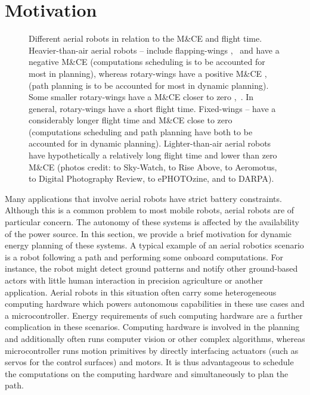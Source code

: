 \section{Motivation}
\label{sec:motivation}

\begin{figure}[t]
  \centering
  \footnotesize{}\selectfont
  
  \caption[Different aerial robots in relation to the M\&CE and flight time]{Different aerial robots in relation to the M\&CE and flight time. Heavier-than-air aerial robots -- include flapping-wings ,~ and have a negative M\&CE (computations scheduling is to be accounted for most in planning), whereas rotary-wings have a positive M\&CE ,~ (path planning is to be accounted for most in dynamic planning). Some smaller rotary-wings have a M\&CE closer to zero ,~. In general, rotary-wings have a short flight time. Fixed-wings -- have a considerably longer flight time and M\&CE close to zero (computations scheduling and path planning have both to be accounted for in dynamic planning). Lighter-than-air aerial robots  have hypothetically a relatively long flight time and lower than zero M\&CE {\scriptsize(photos credit:  to Sky-Watch,  to Rise Above,  to Aeromotus,  to Digital Photography Review,  to ePHOTOzine, and  to DARPA)}.}
  \label{fig:plot10}
\end{figure}

Many applications that involve aerial robots have strict battery constraints. Although this is a common problem to most mobile robots, aerial robots are of particular concern. The autonomy of these systems is affected by the availability of the power source. In this section, we provide a brief motivation for dynamic energy planning of these systems. A typical example of an aerial robotics scenario is a robot following a path and performing some onboard computations. For instance, the robot might detect ground patterns and notify other ground-based actors with little human interaction in precision agriculture or another application. Aerial robots in this situation often carry some heterogeneous computing hardware which powers autonomous capabilities in these use cases and a microcontroller. Energy requirements of such computing hardware are a further complication in these scenarios. Computing hardware is involved in the planning and additionally often runs computer vision or other complex algorithms, whereas microcontroller runs motion primitives by directly interfacing actuators (such as servos for the control surfaces) and motors. It is thus advantageous to schedule the computations on the computing hardware and simultaneously to plan the path. 

